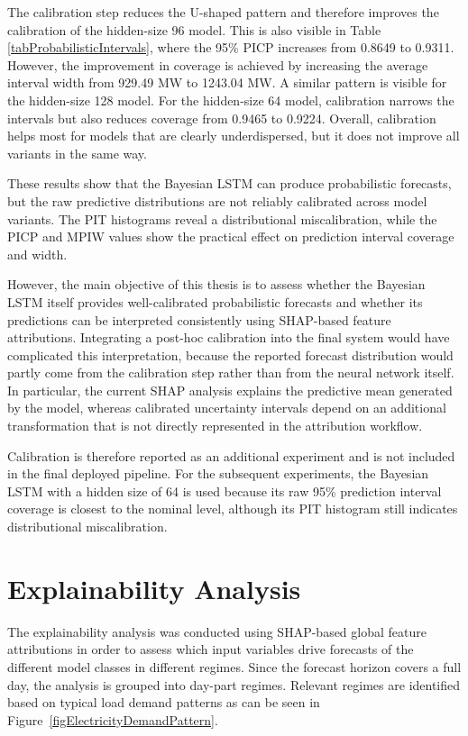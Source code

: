 \documentclass[Master,english,IEEE]{twbook}
\begin{document}
 
The calibration step reduces the U-shaped pattern and therefore improves the calibration of the hidden-size 96 model. This is also visible in Table \ref{tabProbabilisticIntervals}, where the 95\% PICP increases from 0.8649 to 0.9311. However, the improvement in coverage is achieved by increasing the average interval width from 929.49 MW to 1243.04 MW. A similar pattern is visible for the hidden-size 128 model. For the hidden-size 64 model, calibration narrows the intervals but also reduces coverage from 0.9465 to 0.9224. Overall, calibration helps most for models that are clearly underdispersed, but it does not improve all variants in the same way.

These results show that the Bayesian LSTM can produce probabilistic forecasts, but the raw predictive distributions are not reliably calibrated across model variants. The PIT histograms reveal a distributional miscalibration, while the PICP and MPIW values show the practical effect on prediction interval coverage and width.

However, the main objective of this thesis is to assess whether the Bayesian LSTM itself provides well-calibrated probabilistic forecasts and whether its predictions can be interpreted consistently using SHAP-based feature attributions. Integrating a post-hoc calibration into the final system would have complicated this interpretation, because the reported forecast distribution would partly come from the calibration step rather than from the neural network itself. In particular, the current SHAP analysis explains the predictive mean generated by the model, whereas calibrated uncertainty intervals depend on an additional transformation that is not directly represented in the attribution workflow.


Calibration is therefore reported as an additional experiment and is not included in the final deployed pipeline. For the subsequent experiments, the Bayesian LSTM with a hidden size of 64 is used because its raw 95\% prediction interval coverage is closest to the nominal level, although its PIT histogram still indicates distributional miscalibration.



\section{Explainability Analysis}
\label{sec:explainability-analysis}

The explainability analysis was conducted using SHAP-based global feature attributions in order to assess which input variables drive forecasts of the different model classes in different regimes. Since the forecast horizon covers a full day, the analysis is grouped into day-part regimes. Relevant regimes are identified based on typical load demand patterns as can be seen in Figure~\ref{figElectricityDemandPattern}. 
\end{document}
